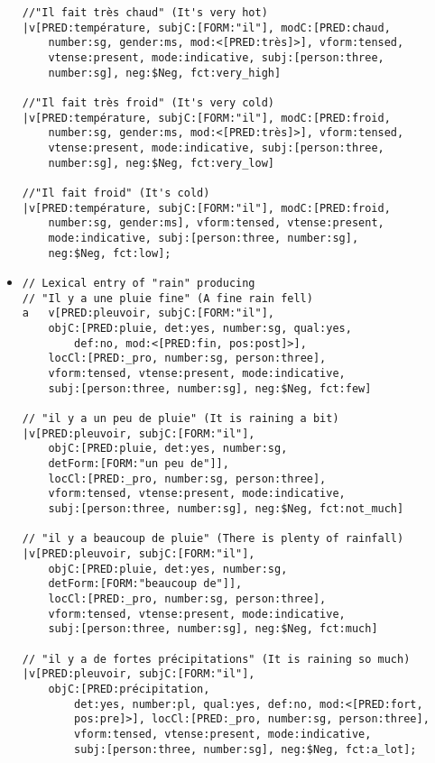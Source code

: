 \documentclass[11pt]{article}
\begin{document}
\begin{itemize}
\begin{verbatim}
//"Il fait très chaud" (It's very hot)
|v[PRED:température, subjC:[FORM:"il"], modC:[PRED:chaud, 
	number:sg, gender:ms, mod:<[PRED:très]>], vform:tensed, 
	vtense:present, mode:indicative, subj:[person:three, 
	number:sg], neg:$Neg, fct:very_high]

//"Il fait très froid" (It's very cold)
|v[PRED:température, subjC:[FORM:"il"], modC:[PRED:froid, 
	number:sg, gender:ms, mod:<[PRED:très]>], vform:tensed,
	vtense:present, mode:indicative, subj:[person:three, 
	number:sg], neg:$Neg, fct:very_low]

//"Il fait froid" (It's cold)
|v[PRED:température, subjC:[FORM:"il"], modC:[PRED:froid, 
	number:sg, gender:ms], vform:tensed, vtense:present, 
	mode:indicative, subj:[person:three, number:sg], 
	neg:$Neg, fct:low]; 
\end{verbatim}
	
\bigskip
\item \begin{verbatim}
// Lexical entry of "rain" producing
// "Il y a une pluie fine" (A fine rain fell)
a	v[PRED:pleuvoir, subjC:[FORM:"il"], 
	objC:[PRED:pluie, det:yes, number:sg, qual:yes,
		def:no, mod:<[PRED:fin, pos:post]>], 
	locCl:[PRED:_pro, number:sg, person:three], 
	vform:tensed, vtense:present, mode:indicative, 
	subj:[person:three, number:sg], neg:$Neg, fct:few]
	
// "il y a un peu de pluie" (It is raining a bit)
|v[PRED:pleuvoir, subjC:[FORM:"il"], 
	objC:[PRED:pluie, det:yes, number:sg, 
	detForm:[FORM:"un peu de"]], 
	locCl:[PRED:_pro, number:sg, person:three], 
	vform:tensed, vtense:present, mode:indicative, 
	subj:[person:three, number:sg], neg:$Neg, fct:not_much]

// "il y a beaucoup de pluie" (There is plenty of rainfall)
|v[PRED:pleuvoir, subjC:[FORM:"il"], 
	objC:[PRED:pluie, det:yes, number:sg, 
	detForm:[FORM:"beaucoup de"]], 
	locCl:[PRED:_pro, number:sg, person:three], 
	vform:tensed, vtense:present, mode:indicative, 
	subj:[person:three, number:sg], neg:$Neg, fct:much]

// "il y a de fortes précipitations" (It is raining so much)
|v[PRED:pleuvoir, subjC:[FORM:"il"], 
	objC:[PRED:précipitation,
        det:yes, number:pl, qual:yes, def:no, mod:<[PRED:fort,
        pos:pre]>], locCl:[PRED:_pro, number:sg, person:three],
        vform:tensed, vtense:present, mode:indicative,
        subj:[person:three, number:sg], neg:$Neg, fct:a_lot]; 
\end{verbatim}

\end{itemize}
\end{document}
